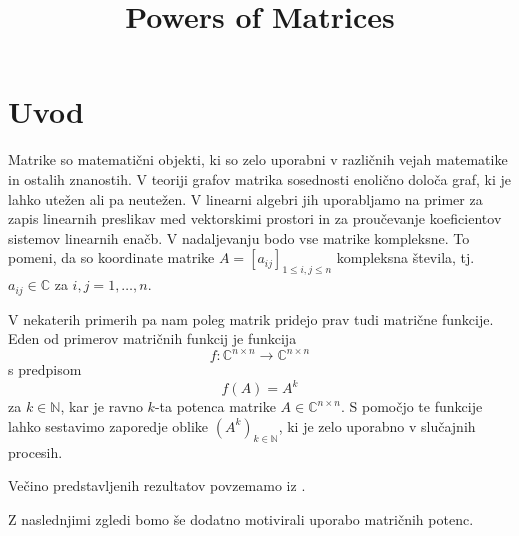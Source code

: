 \documentclass[mat1]{fmfdelo}
\title{Powers of Matrices}
\newcommand{\N}{\mathbb N}
\newcommand{\C}{\mathbb C}
\begin{document}
\section{Uvod}
Matrike so matematični objekti, ki so zelo uporabni v različnih vejah matematike in ostalih znanostih. V teoriji grafov matrika sosednosti enolično določa graf, ki je lahko utežen ali pa neutežen. V linearni algebri jih uporabljamo na primer za zapis linearnih preslikav med vektorskimi prostori in za proučevanje koeficientov sistemov linearnih enačb. V nadaljevanju bodo vse matrike kompleksne. To pomeni, da so koordinate matrike $A = [a_{ij}]_{1 \leq i,j \leq n}$ kompleksna števila, tj.\ $a_{ij} \in \C$ za $i,j = 1, \ldots, n$.

V nekaterih primerih pa nam poleg matrik pridejo prav tudi matrične funkcije. Eden od primerov matričnih funkcij je funkcija
\[f: \C^{n\times n} \rightarrow \C^{n\times n}\] s predpisom
\[f(A) = A^k\]
za $k\in\N$, kar je ravno $k$-ta potenca matrike $A\in\C^{n\times n}$. S pomočjo te funkcije lahko sestavimo zaporedje oblike $(A^k)_{k \in \N}$, ki je zelo uporabno v slučajnih procesih.

Večino predstavljenih rezultatov povzemamo iz \cite[2. poglavje, 3. poglavje, dodatek A]{kramar}.

Z naslednjimi zgledi bomo še dodatno motivirali uporabo matričnih potenc.
\end{document}
